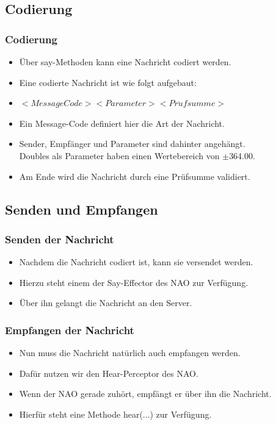 \subsection{Codierung}
\frame
{
  \frametitle{Codierung}
  
  \begin{itemize}
    \item<1-> \"Uber say-Methoden kann eine Nachricht codiert werden.
    \item<2-> Eine codierte Nachricht ist wie folgt aufgebaut: \vskip0.5cm
    \item<3-> $<MessageCode><Parameter><Pr\ddot{u}fsumme>$ \vskip0.5cm
    \item<4-> Ein Message-Code definiert hier die Art der Nachricht.
    \item<5-> Sender, Empf\"anger und Parameter sind dahinter angeh\"angt. \\Doubles als Parameter haben einen Wertebereich von $\pm$364.00.
    \item<6-> Am Ende wird die Nachricht durch eine Pr\"ufsumme validiert.
  \end{itemize}
}

\subsection{Senden und Empfangen}
\frame
{
  \frametitle{Senden der Nachricht}
  
  \begin{itemize}
    \item<1-> Nachdem die Nachricht codiert ist, kann sie versendet werden.
    \item<2-> Hierzu steht einem der Say-Effector des NAO zur Verf\"ugung.
    \item<3-> \"Uber ihn gelangt die Nachricht an den Server.
  \end{itemize}
}

\frame
{
  \frametitle{Empfangen der Nachricht}
  
  \begin{itemize}
    \item<1-> Nun muss die Nachricht nat\"urlich auch empfangen werden.
    \item<2-> Daf\"ur nutzen wir den Hear-Perceptor des NAO.
    \item<3-> Wenn der NAO gerade zuh\"ort, empf\"angt er \"uber ihn die Nachricht.
    \item<4-> Hierf\"ur steht eine Methode hear(...) zur Verf\"ugung.
  \end{itemize}
}

